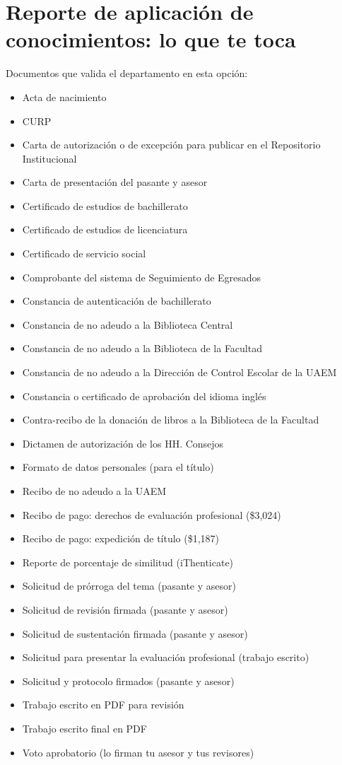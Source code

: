 \section{Reporte de aplicación de conocimientos: lo que te toca}
Documentos que valida el departamento en esta opción:
\begin{itemize}
  \item Acta de nacimiento
  \item CURP
  \item Carta de autorización o de excepción para publicar en el Repositorio Institucional
  \item Carta de presentación del pasante y asesor
  \item Certificado de estudios de bachillerato
  \item Certificado de estudios de licenciatura
  \item Certificado de servicio social
  \item Comprobante del sistema de Seguimiento de Egresados
  \item Constancia de autenticación de bachillerato
  \item Constancia de no adeudo a la Biblioteca Central
  \item Constancia de no adeudo a la Biblioteca de la Facultad
  \item Constancia de no adeudo a la Dirección de Control Escolar de la UAEM
  \item Constancia o certificado de aprobación del idioma inglés
  \item Contra-recibo de la donación de libros a la Biblioteca de la Facultad
  \item Dictamen de autorización de los HH. Consejos
  \item Formato de datos personales (para el título)
  \item Recibo de no adeudo a la UAEM
  \item Recibo de pago: derechos de evaluación profesional (\$3,024)
  \item Recibo de pago: expedición de título (\$1,187)
  \item Reporte de porcentaje de similitud (iThenticate)
  \item Solicitud de prórroga del tema (pasante y asesor)
  \item Solicitud de revisión firmada (pasante y asesor)
  \item Solicitud de sustentación firmada (pasante y asesor)
  \item Solicitud para presentar la evaluación profesional (trabajo escrito)
  \item Solicitud y protocolo firmados (pasante y asesor)
  \item Trabajo escrito en PDF para revisión
  \item Trabajo escrito final en PDF
  \item Voto aprobatorio (lo firman tu asesor y tus revisores)
\end{itemize}
